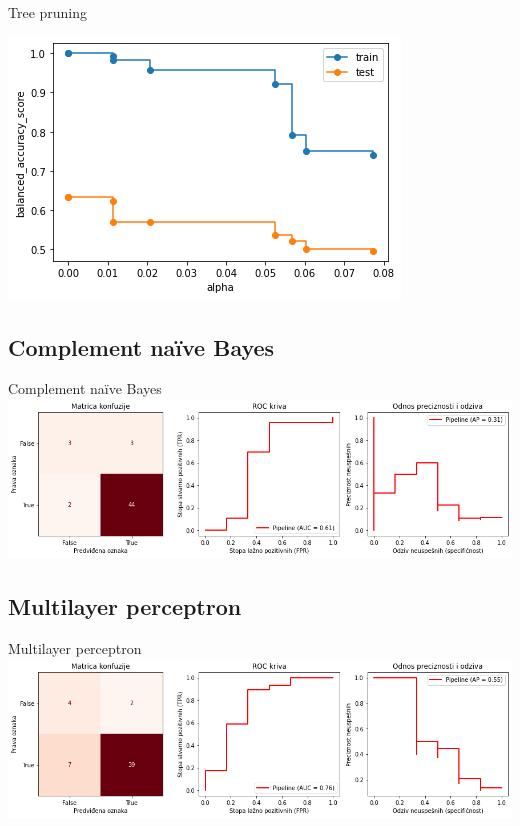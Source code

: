 \documentclass[hyperref={bookmarks=false}]{beamer}
\begin{document}
\begin{frame}{Tree pruning}
\begin{center}
    \includegraphics[width=.75\textwidth]{pruning.png}
\end{center}
\end{frame}

\subsection{Complement naïve Bayes}
\begin{frame}{Complement naïve Bayes}
\includegraphics[width=\textwidth]{cnb.png}
\end{frame}

\subsection{Multilayer perceptron}
\begin{frame}{Multilayer perceptron}
\includegraphics[width=\textwidth]{mlp.png}
\end{frame}
\end{document}
